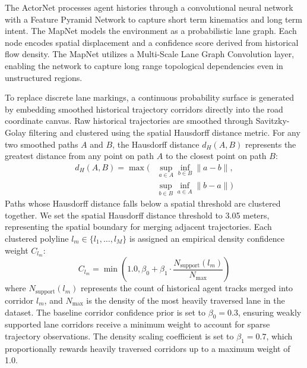 \documentclass{article}
\begin{document}
The ActorNet processes agent histories through a convolutional neural network with a Feature Pyramid Network to capture short term kinematics and long term intent. The MapNet models the environment as a probabilistic lane graph. Each node encodes spatial displacement and a confidence score derived from historical flow density. The MapNet utilizes a Multi-Scale Lane Graph Convolution layer, enabling the network to capture long range topological dependencies even in unstructured regions.

To replace discrete lane markings, a continuous probability surface is generated by embedding smoothed historical trajectory corridors directly into the road coordinate canvas. Raw historical trajectories are smoothed through Savitzky-Golay filtering and clustered using the spatial Hausdorff distance metric. For any two smoothed paths $A$ and $B$, the Hausdorff distance $d_H(A, B)$ represents the greatest distance from any point on path $A$ to the closest point on path $B$:
\begin{equation}
\begin{aligned}
d_H(A, B) = \max \Big( &\sup_{a \in A} \inf_{b \in B} \|a - b\|, \\
&\sup_{b \in B} \inf_{a \in A} \|b - a\| \Big)
\end{aligned}
\end{equation}
Paths whose Hausdorff distance falls below a spatial threshold are clustered together. We set the spatial Hausdorff distance threshold to 3.05 meters, representing the spatial boundary for merging adjacent trajectories. Each clustered polyline $l_m \in \{l_1, \dots, l_M\}$ is assigned an empirical density confidence weight $C_{l_m}$:
\begin{equation}
C_{l_m} = \min \left( 1.0, \beta_0 + \beta_1 \cdot \frac{N_{\text{support}}(l_m)}{N_{\text{max}}} \right)
\end{equation}
where $N_{\text{support}}(l_m)$ represents the count of historical agent tracks merged into corridor $l_m$, and $N_{\text{max}}$ is the density of the most heavily traversed lane in the dataset. The baseline corridor confidence prior is set to $\beta_0 = 0.3$, ensuring weakly supported lane corridors receive a minimum weight to account for sparse trajectory observations. The density scaling coefficient is set to $\beta_1 = 0.7$, which proportionally rewards heavily traversed corridors up to a maximum weight of 1.0.
\end{document}
